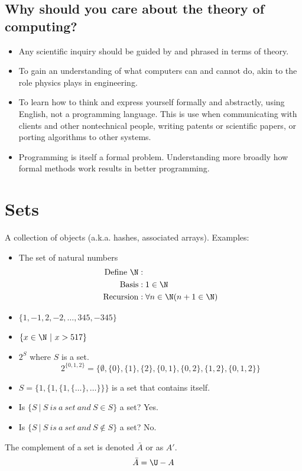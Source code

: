 \documentclass[letterpaper, 12pt]{math}
\begin{document}
\subsection*{Why should you care about the theory of computing?}
\begin{itemize}
  \item Any scientific inquiry should be guided by and phrased in
    terms of theory.
  \item To gain an understanding of what computers can and cannot do, akin
    to the role physics plays in engineering.
  \item To learn how to think and express yourself formally and abstractly,
    using English, not a programming language. This is use when communicating
    with clients and other nontechnical people, writing patents or scientific
    papers, or porting algorithms to other systems.
  \item Programming is itself a formal problem. Understanding more broadly how
    formal methods work results in better programming.
\end{itemize}

\section*{Sets}
A collection of objects (a.k.a. hashes, associated arrays). Examples:
\begin{itemize}
  \item The set of natural numbers
  \begin{align*}
    \mathrm{Define}\ \N&: \\
    \mathrm{Basis}&: 1\in\N \\
    \mathrm{Recursion}&: \forall n\in\N(n+1\in\N)
  \end{align*}
  \item \( \{1,-1,2,-2,\dots,345,-345\} \)
  \item \( \{x\in\N\ |\ x>517\} \)
  \item \( 2^{S} \) where \( S \) is a set.
    \[ 2^{\{0,1,2\}} = \{\emptyset,\{0\},\{1\},\{2\},\{0,1\},
      \{0,2\},\{1,2\},\{0,1,2\}\} \]
  \item \( S = \{1,\{1,\{1,\{\dots\},\dots\}\}\} \) is a set that
    contains itself.
  \item Is \( \{S\ |\ S\ is\ a\ set\ and\ S\in S\} \) a set? Yes.
  \item Is \( \{S\ |\ S\ is\ a\ set\ and\ S\notin S\} \) a set? No.
\end{itemize}
The complement of a set is denoted \( \bar{A} \) or as \( A' \).
\[ \bar{A} = \U-A \]
\end{document}
